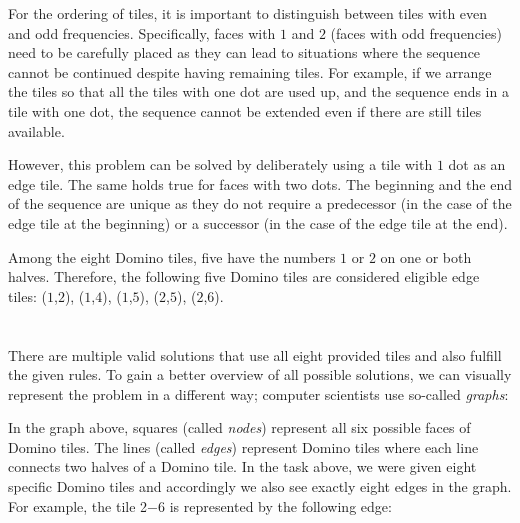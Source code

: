 {{For the ordering of tiles, it is important to distinguish between tiles with even and odd frequencies. Specifically, faces with $1$ and $2$ (faces with odd frequencies) need to be carefully placed as they can lead to situations where the sequence cannot be continued despite having remaining tiles. For example, if we arrange the tiles so that all the tiles with one dot are used up, and the sequence ends in a tile with one dot, the sequence cannot be extended even if there are still tiles available.

{\centering%
\par}

However, this problem can be solved by deliberately using a tile with $1$ dot as an edge tile. The same holds true for faces with two dots. The beginning and the end of the sequence are unique as they do not require a predecessor (in the case of the edge tile at the beginning) or a successor (in the case of the edge tile at the end).

Among the eight Domino tiles, five have the numbers $1$ or $2$ on one or both halves. Therefore, the following five Domino tiles are considered eligible edge tiles: ($1$,$2$), ($1$,$4$), ($1$,$5$), ($2$,$5$), ($2$,$6$).



\section*{\BrochureItsInformatics}
There are multiple valid solutions that use all eight provided tiles and also fulfill the given rules. To gain a better overview of all possible solutions, we can visually represent the problem in a different way; computer scientists use so-called \emph{graphs}:

{\centering%
\par}

In the graph above, squares (called \emph{nodes}) represent all six possible faces of Domino tiles. The lines (called \emph{edges}) represent Domino tiles where each line connects two halves of a Domino tile. In the task above, we were given eight specific Domino tiles and accordingly we also see exactly eight edges in the graph. For example, the tile 2$-6$ is represented by the following edge:

{\centering%
\par}

}}
